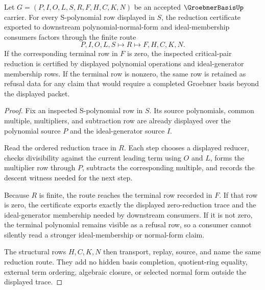 \begin{theorem}
\label{thm:groebner-basis-reduction-certificate}
Let $G=(P,I,O,L,S,R,F,H,C,K,N)$ be an accepted $\GroebnerBasisUp$ carrier. For every S-polynomial row displayed in $S$, the reduction certificate exported to downstream polynomial-normal-form and ideal-membership consumers factors through the finite route
$$
P,I,O,L,S \longmapsto R \longmapsto F,H,C,K,N .
$$
If the corresponding terminal row in $F$ is zero, the inspected critical-pair reduction is certified by displayed polynomial operations and ideal-generator membership rows. If the terminal row is nonzero, the same row is retained as refusal data for any claim that would require a completed Groebner basis beyond the displayed packet.
\end{theorem}
\begin{proof}
Fix an inspected S-polynomial row in $S$. Its source polynomials, common multiple, multipliers, and subtraction row are already displayed over the polynomial source $P$ and the ideal-generator source $I$.

Read the ordered reduction trace in $R$. Each step chooses a displayed reducer, checks divisibility against the current leading term using $O$ and $L$, forms the multiplier row through $P$, subtracts the corresponding multiple, and records the descent witness needed for the next step.

Because $R$ is finite, the route reaches the terminal row recorded in $F$. If that row is zero, the certificate exports exactly the displayed zero-reduction trace and the ideal-generator membership needed by downstream consumers. If it is not zero, the terminal polynomial remains visible as a refusal row, so a consumer cannot silently read a stronger ideal-membership or normal-form claim.

The structural rows $H,C,K,N$ then transport, replay, source, and name the same reduction route. They add no hidden basis completion, quotient-ring equality, external term ordering, algebraic closure, or selected normal form outside the displayed trace.
\end{proof}


